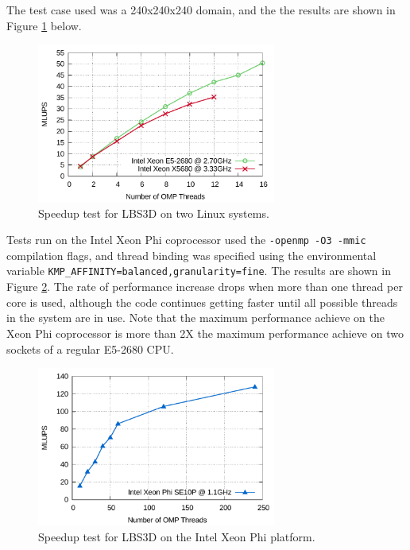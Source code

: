 \documentclass[12pt]{report}
\begin{document}
The test case used was a 240x240x240 domain, and the the results are shown in Figure \ref{fig:scaling_cpu} below.

\begin{figure}[!htb]
\centering
\includegraphics[width=0.7\textwidth]{scaling_cpu.pdf}
\caption{Speedup test for LBS3D on two Linux systems.}
\label{fig:scaling_cpu}
\end{figure}

Tests run on the Intel Xeon Phi coprocessor used the \verb+-openmp -O3 -mmic+ compilation flags, and thread binding was specified using the environmental variable \verb+KMP_AFFINITY=balanced,granularity=fine+. The results are shown in Figure \ref{fig:scaling_mic}. The rate of performance increase drops when more than one thread per core is used, although the code continues getting faster until all possible threads in the system are in use. Note that the maximum performance achieve on the Xeon Phi coprocessor is more than 2X the maximum performance achieve on two sockets of a regular E5-2680 CPU.

\begin{figure}[!htb]
\centering
\includegraphics[width=0.7\textwidth]{scaling_mic.pdf}
\caption{Speedup test for LBS3D on the Intel Xeon Phi platform.}
\label{fig:scaling_mic}
\end{figure}
\end{document}
